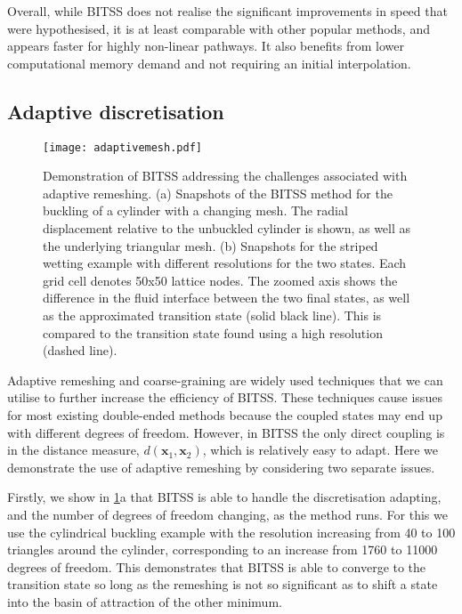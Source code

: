 \documentclass[aip,jcp,reprint,twocolumn]{revtex4-1}
\begin{document}
Overall, while BITSS does not realise the significant improvements in speed that were hypothesised, it is at least comparable with other popular methods, and appears faster for highly non-linear pathways.
It also benefits from lower computational memory demand and not requiring an initial interpolation.


\subsection{Adaptive discretisation}\label{sec:adaptive}
\begin{figure}[tb]
  \texttt{[image: adaptivemesh.pdf]}
  \caption{\label{fig:adaptivemesh}
    Demonstration of BITSS addressing the challenges associated with adaptive remeshing.
    (a) Snapshots of the BITSS method for the buckling of a cylinder with a changing mesh.
        The radial displacement relative to the unbuckled cylinder is shown, as well as the underlying triangular mesh.
    (b) Snapshots for the striped wetting example with different resolutions for the two states.
        Each grid cell denotes 50x50 lattice nodes.
        The zoomed axis shows the difference in the fluid interface between the two final states, as well as the approximated transition state (solid black line).
        This is compared to the transition state found using a high resolution (dashed line).
  }
\end{figure}

Adaptive remeshing and coarse-graining are widely used techniques that we can utilise to further increase the efficiency of BITSS.
These techniques cause issues for most existing double-ended methods because the coupled states may end up with different degrees of freedom.
However, in BITSS the only direct coupling is in the distance measure, $d(\bm{x}_1,\bm{x}_2)$, which is relatively easy to adapt.
Here we demonstrate the use of adaptive remeshing by considering two separate issues.

Firstly, we show in \cref{fig:adaptivemesh}a that BITSS is able to handle the discretisation adapting, and the number of degrees of freedom changing, as the method runs.
For this we use the cylindrical buckling example with the resolution increasing from 40 to 100 triangles around the cylinder, corresponding to an increase from \num{1760} to \num{11000} degrees of freedom.
This demonstrates that BITSS is able to converge to the transition state so long as the remeshing is not so significant as to shift a state into the basin of attraction of the other minimum.
\end{document}
